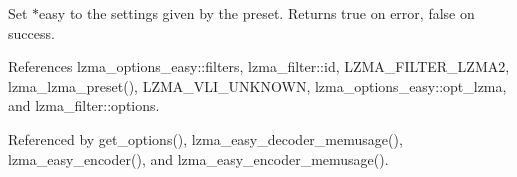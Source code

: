 Set $\ast$easy to the settings given by the preset. Returns true on error, false on success. 

References lzma\+\_\+options\+\_\+easy\+::filters, lzma\+\_\+filter\+::id, L\+Z\+M\+A\+\_\+\+F\+I\+L\+T\+E\+R\+\_\+\+L\+Z\+M\+A2, lzma\+\_\+lzma\+\_\+preset(), L\+Z\+M\+A\+\_\+\+V\+L\+I\+\_\+\+U\+N\+K\+N\+O\+WN, lzma\+\_\+options\+\_\+easy\+::opt\+\_\+lzma, and lzma\+\_\+filter\+::options.



Referenced by get\+\_\+options(), lzma\+\_\+easy\+\_\+decoder\+\_\+memusage(), lzma\+\_\+easy\+\_\+encoder(), and lzma\+\_\+easy\+\_\+encoder\+\_\+memusage().

